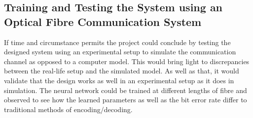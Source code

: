 \subsection{Training and Testing the System using an Optical Fibre Communication System}

If time and circumstance permits the project could conclude by testing the designed system using an experimental setup to simulate the communication channel as opposed to a computer model. This would bring light to discrepancies between the real-life setup and the simulated model. As well as that, it would validate that the design works as well in an experimental setup as it does in simulation. The neural network could be trained at different lengths of fibre and observed to see how the learned parameters as well as the bit error rate differ to traditional methods of encoding/decoding. 
